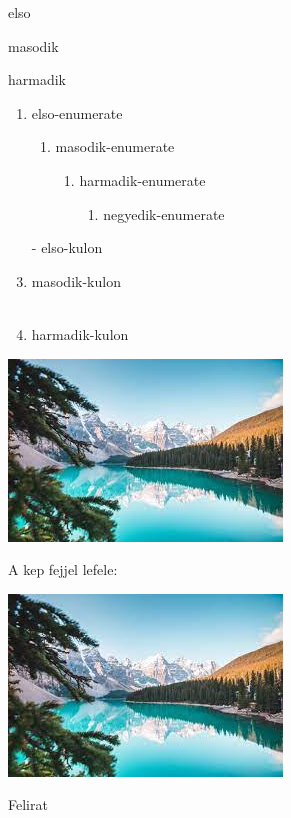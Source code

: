 \documentclass{article}
\begin{document}
\begin{itemize*}[label=-,itemjoin*={    , és}]
\item elso
\item masodik 
\item harmadik

\end{itemize*}

\begin{enumerate}
\item elso-enumerate
\begin{enumerate}
\item masodik-enumerate
\begin{enumerate}
\item harmadik-enumerate
\begin{enumerate}
\item negyedik-enumerate

\end{enumerate}
\end{enumerate}
\end{enumerate}
\item[-] elso-kulon
\item masodik-kulon
\\
\hulipsum[1-3]
\\
\item harmadik-kulon
\end{enumerate}


\begin{description}
\item [cimke] \hulipsum[1-2]
\item \hulipsum[1-2]
\item[HOOOOOOSSSSZZZZUUUU CCCCCIIIIMMMKKKEEE] \hulipsum[1-5]
\end{description}

\includegraphics{kep.jpg}

A kep fejjel lefele:

\includegraphics[angle=180]{kep.jpg}
\caption{Felirat}
\end{document}
